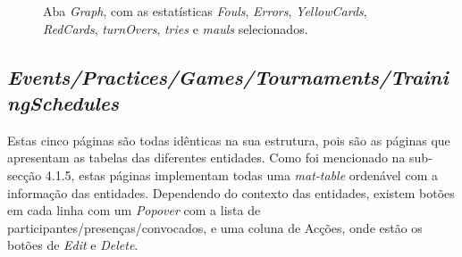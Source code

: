 \begin{figure}[h]
	\begin{center}
	\end{center}
	\caption{Aba \textit{Graph}, com as estatísticas \textit{Fouls}, \textit{Errors}, \textit{YellowCards}, \textit{RedCards}, \textit{turnOvers}, \textit{tries} e \textit{mauls} selecionados.}\label{fig:athleteprofile}
\end{figure}
\newpage

\subsection{\textit{Events/Practices/Games/Tournaments/TrainingSchedules}}\label{subsec426}
Estas cinco páginas são todas idênticas na sua estrutura, pois são as páginas que apresentam as tabelas das diferentes entidades.
Como foi mencionado na sub-secção 4.1.5, estas páginas implementam todas uma \textit{mat-table} ordenável com a informação das entidades. Dependendo do contexto das entidades, existem botões em cada linha com um \textit{Popover} com a lista de participantes/presenças/convocados, e uma coluna de Acções, onde estão os botões de \textit{Edit} e \textit{Delete}.

